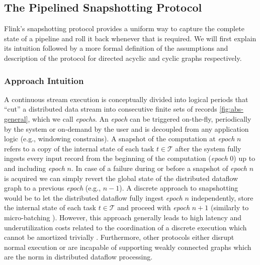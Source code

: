 \subsection{The Pipelined Snapshotting Protocol}
\label{sec:snapshots}
Flink's snapshotting protocol provides a uniform way to capture the complete state of a pipeline and roll it back whenever that is required. We will first explain its intuition followed by a more formal definition of the assumptions and description of the protocol for directed acyclic and cyclic graphs respectively.

\subsubsection{Approach Intuition}

A continuous stream execution is conceptually divided into logical periods that ``cut'' a distributed data stream into consecutive finite sets of records \ref{fig:abs-general}, which we call \emph{epochs}. An \emph{epoch} can be triggered on-the-fly, periodically by the system or on-demand by the user and is decoupled from any application logic (e.g., windowing constrains). A snapshot of the computation at \emph{epoch} $n$ refers to a copy of the internal state of each task $t \in \mathcal{T}$ after the system fully ingests every input record from the beginning of the computation (\emph{epoch} 0) up to and including \emph{epoch} $n$. In case of a failure during or before a snapshot of \emph{epoch} $n$ is acquired we can simply revert the global state of the distributed dataflow graph to a previous \emph{epoch} (e.g., $n-1$). A discrete approach to snapshotting would be to let the distributed dataflow fully ingest \emph{epoch} $n$ independently, store the internal state of each task $t \in \mathcal{T}$ and proceed with \emph{epoch} $n+1$ (similarly to micro-batching \cite{zaharia2012discretized}). However, this approach generally leads to high latency and underutilization costs related to the coordination of a discrete execution which cannot be amortized trivially \cite{venkataramandrizzle}. Furthermore, other protocols either disrupt normal execution \cite{murray2013naiad,jacques2016consistent} or are incapable of supporting weakly connected graphs \cite{chandy1985distributed} which are the norm in distributed dataflow processing.

